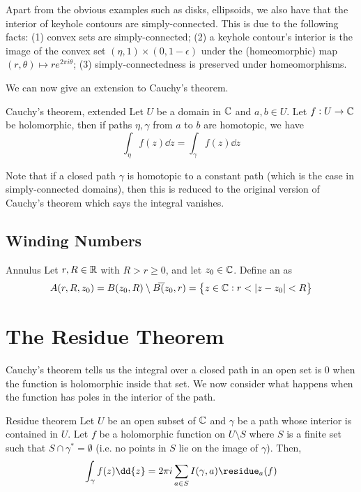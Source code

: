 \documentclass{styles/tufte}
\begin{document}
  Apart from the obvious examples such as disks, ellipsoids, we also have that the interior of keyhole contours are simply-connected. This is due to the following facts: (1) convex sets are simply-connected; (2) a keyhole contour's interior is the image of the convex set $(\eta, 1) \times (0, 1 - \epsilon)$ under the (homeomorphic) map $(r, \theta) \mapsto re^{2\pi i\theta}$; (3) simply-connectedness is preserved under homeomorphisms.
  
  We can now give an extension to Cauchy's theorem.
  
  \begin{theorem}{Cauchy's theorem, extended}{}
    Let $U$ be a domain in $\mathbb{C}$ and $a, b \in U$. Let $f: U \to \mathbb{C}$ be holomorphic, then if paths $\eta, \gamma$ from $a$ to $b$ are homotopic, we have
    \[ \int_\eta f(z) \dd{z} = \int_\gamma f(z) \dd{z} \]
  \end{theorem}
  
  Note that if a closed path $\gamma$ is homotopic to a constant path (which is the case in simply-connected domains), then this is reduced to the original version of Cauchy's theorem which says the integral vanishes.


\subsection{Winding Numbers}
  
  \begin{definition}{Annulus}{}
    Let $r, R \in \mathbb{R}$ with $R > r \geqslant 0$, and let $z_0 \in \mathbb{C}$. Define an  as
    \[ A(r, R, z_0) = B(z_0, R) \setminus \overline{B}(z_0, r) = \set{z \in \CC: r < \abs{z - z_0} < R} \]
  \end{definition}



\section{The Residue Theorem}

Cauchy's theorem tells us the integral over a closed path in an open set is $0$ when the function is holomorphic inside that set. We now consider what happens when the function has poles in the interior of the path.

\begin{theorem}{Residue theorem}{}
  Let $U$ be an open subset of $\mathbb{C}$ and $\gamma$ be a path whose interior is contained in $U$. Let $f$ be a holomorphic function on $U \setminus S$ where $S$ is a finite set such that $S \cap \gamma^* = \emptyset$ (i.e. no points in $S$ lie on the image of $\gamma$). Then,
  \[ \int_\gamma f(z) \dd{z} = 2\pi i \sum_{a \in S} I(\gamma, a) \residue_a(f) \]
\end{theorem}
%  
\end{document}
